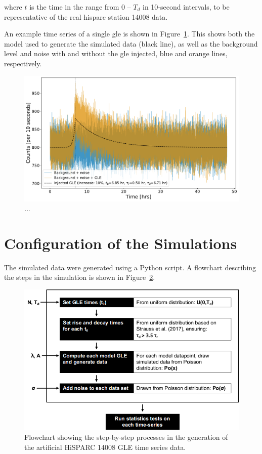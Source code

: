 where $t$ is the time in the range from 0 -- $T_d$ in 10-second intervals, to be representative of the real \gls{hisparc} station 14008 data.

An example time series of a single \gls{gle} is shown in Figure~\ref{fig:simulated_HS14008_GLE_data}. This shows both the model used to generate the simulated data (black line), as well as the background level and noise with and without the \gls{gle} injected, blue and orange lines, respectively.

\begin{figure}[ht!]
	\centering
	\includegraphics[width=\columnwidth]{simulated_HS14008_GLE_data.pdf}
	\caption{...}
	\label{fig:simulated_HS14008_GLE_data}
\end{figure}


\section{Configuration of the Simulations}

The simulated data were generated using a Python script. A flowchart describing the steps in the simulation is shown in Figure~\ref{fig:gle_flowchart}. 

\begin{figure}[ht!]
	\centering
	\includegraphics[width=0.9\columnwidth]{GLE_sims_flowchart.png}
	\caption{Flowchart showing the step-by-step processes in the generation of the artificial HiSPARC 14008 GLE time series data.}
	\label{fig:gle_flowchart}
\end{figure}

